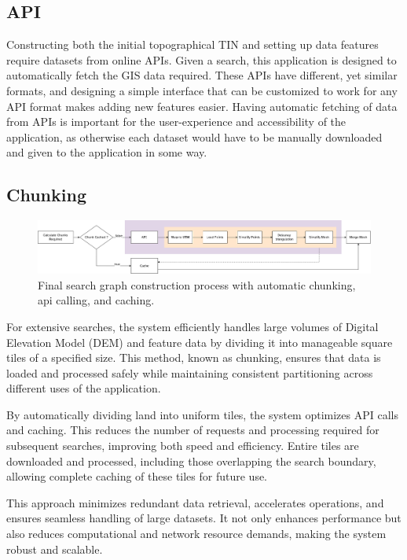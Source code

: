\documentclass[12pt]{article}
\begin{document}
\subsection{API}

Constructing both the initial topographical TIN and setting up data features require datasets from online APIs. Given a search, this application is designed to automatically fetch the GIS data required. These APIs have different, yet similar formats, and designing a simple interface that can be customized to work for any API format makes adding new features easier. Having automatic fetching of data from APIs is important for the user-experience and accessibility of the application, as otherwise each dataset would have to be manually downloaded and given to the application in some way.

\subsection{Chunking}

\begin{figure}[!htbp]
  \centering
  \includegraphics[width=1\textwidth]{assets/meshConstruction.png}
  \caption{Final search graph construction process with automatic chunking, api calling, and caching.}\label{fig:mesh_construction:full}
\end{figure}

For extensive searches, the system efficiently handles large volumes of Digital Elevation Model (DEM) and feature data by dividing it into manageable square tiles of a specified size. This method, known as chunking, ensures that data is loaded and processed safely while maintaining consistent partitioning across different uses of the application.

By automatically dividing land into uniform tiles, the system optimizes API calls and caching. This reduces the number of requests and processing required for subsequent searches, improving both speed and efficiency. Entire tiles are downloaded and processed, including those overlapping the search boundary, allowing complete caching of these tiles for future use.

This approach minimizes redundant data retrieval, accelerates operations, and ensures seamless handling of large datasets. It not only enhances performance but also reduces computational and network resource demands, making the system robust and scalable.
\end{document}
